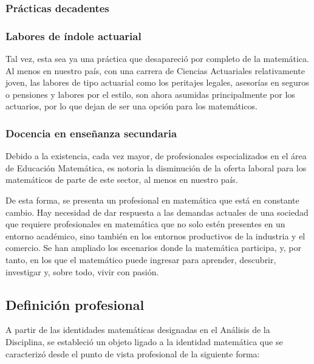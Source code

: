 \subsubsection{Prácticas decadentes}

\subsubsection{Labores de índole actuarial}

Tal vez, esta sea ya una práctica que desapareció por completo de la matemática. Al menos en nuestro país, con una carrera de Ciencias Actuariales relativamente joven, las labores de tipo actuarial como los peritajes legales, asesorías en seguros o pensiones y labores por el estilo, son ahora asumidas principalmente por los actuarios, por lo que dejan de ser una opción para los matemáticos.


\subsubsection{Docencia en enseñanza secundaria}

Debido a la existencia, cada vez mayor, de profesionales especializados en el área de Educación Matemática, es notoria la disminución de la oferta laboral para los matemáticos de parte de este sector, al menos en nuestro país.  

De esta forma, se presenta un profesional en matemática que está en constante cambio. Hay necesidad de dar respuesta a las demandas actuales de una sociedad que requiere profesionales en matemática que no solo estén presentes en un entorno académico, sino también en los entornos productivos de la industria y el comercio. Se han ampliado los escenarios donde la matemática participa, y, por tanto, en los que el matemático puede ingresar para aprender, descubrir, investigar y, sobre todo, vivir con pasión.

\subsection{Definición profesional}

A partir de las identidades matemáticas designadas en el Análisis de la Disciplina, se estableció un objeto ligado a la identidad matemática que se caracterizó desde el punto de vista profesional de la siguiente forma:


